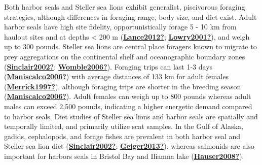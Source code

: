 \documentclass [11pt, proquest] {uwthesis}[2015/03/03]
\begin{document}
Both harbor seals and Steller sea lions exhibit generalist, piscivorous foraging strategies, although differences in foraging range, body size, and diet exist. Adult harbor seals have high site fidelity, opportunistically forage 5 - 10 km from haulout sites and at depths \textless{} 200 m (\protect\hyperlink{ref-Lance2012}{\textbf{Lance2012?}}; \protect\hyperlink{ref-Lowry2001}{\textbf{Lowry2001?}}), and weigh up to 300 pounds. Steller sea lions are central place foragers known to migrate to prey aggregations on the continental shelf and oceanographic boundary zones (\protect\hyperlink{ref-Sinclair2002}{\textbf{Sinclair2002?}}; \protect\hyperlink{ref-Womble2006}{\textbf{Womble2006?}}). Foraging trips can last 1-3 days (\protect\hyperlink{ref-Maniscalco2006}{\textbf{Maniscalco2006?}}) with average distances of 133 km for adult females (\protect\hyperlink{ref-Merrick1997}{\textbf{Merrick1997?}}), although foraging trips are shorter in the breeding season (\protect\hyperlink{ref-Maniscalco2006}{\textbf{Maniscalco2006?}}). Adult females can weigh up to 800 pounds whereas adult males can exceed 2,500 pounds, indicating a higher energetic demand compared to harbor seals. Diet studies of Steller sea lions and harbor seals are spatially and temporally limited, and primarily utilize scat samples. In the Gulf of Alaska, gadids, cephalopods, and forage fishes are prevalent in both harbor seal and Steller sea lion diet (\protect\hyperlink{ref-Sinclair2002}{\textbf{Sinclair2002?}}; \protect\hyperlink{ref-Geiger2013}{\textbf{Geiger2013?}}), whereas salmonids are also important for harbors seals in Bristol Bay and Iliamna lake (\protect\hyperlink{ref-Hauser2008}{\textbf{Hauser2008?}}).
\end{document}
